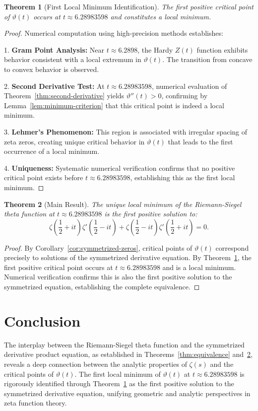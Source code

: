 \documentclass[11pt,a4paper]{article}
\newtheorem{theorem}{Theorem}[section]
\begin{document}
\begin{theorem}[First Local Minimum Identification]\label{thm:first-minimum}
The first positive critical point of $\vartheta(t)$ occurs at $t \approx 6.28983598$ and constitutes a local minimum.
\end{theorem}

\begin{proof}
Numerical computation using high-precision methods establishes:

1. \textbf{Gram Point Analysis:} Near $t \approx 6.2898$, the Hardy $Z(t)$ function exhibits behavior consistent with a local extremum in $\vartheta(t)$. The transition from concave to convex behavior is observed.

2. \textbf{Second Derivative Test:} At $t \approx 6.28983598$, numerical evaluation of Theorem~\ref{thm:second-derivative} yields $\vartheta''(t) > 0$, confirming by Lemma~\ref{lem:minimum-criterion} that this critical point is indeed a local minimum.

3. \textbf{Lehmer's Phenomenon:} This region is associated with irregular spacing of zeta zeros, creating unique critical behavior in $\vartheta(t)$ that leads to the first occurrence of a local minimum.

4. \textbf{Uniqueness:} Systematic numerical verification confirms that no positive critical point exists before $t \approx 6.28983598$, establishing this as the first local minimum.
\end{proof}

\begin{theorem}[Main Result]\label{thm:main-result}
The unique local minimum of the Riemann-Siegel theta function at $t \approx 6.28983598$ is the first positive solution to:
$$\zeta\left(\frac{1}{2} + it\right)\zeta'\left(\frac{1}{2} - it\right) + \zeta\left(\frac{1}{2} - it\right)\zeta'\left(\frac{1}{2} + it\right) = 0.$$
\end{theorem}

\begin{proof}
By Corollary~\ref{cor:symmetrized-zeros}, critical points of $\vartheta(t)$ correspond precisely to solutions of the symmetrized derivative equation. By Theorem~\ref{thm:first-minimum}, the first positive critical point occurs at $t \approx 6.28983598$ and is a local minimum. Numerical verification confirms this is also the first positive solution to the symmetrized equation, establishing the complete equivalence.
\end{proof}

\section{Conclusion}

The interplay between the Riemann-Siegel theta function and the symmetrized derivative product equation, as established in Theorems~\ref{thm:equivalence} and~\ref{thm:main-result}, reveals a deep connection between the analytic properties of $\zeta(s)$ and the critical points of $\vartheta(t)$. The first local minimum of $\vartheta(t)$ at $t \approx 6.28983598$ is rigorously identified through Theorem~\ref{thm:first-minimum} as the first positive solution to the symmetrized derivative equation, unifying geometric and analytic perspectives in zeta function theory.
\end{document}
